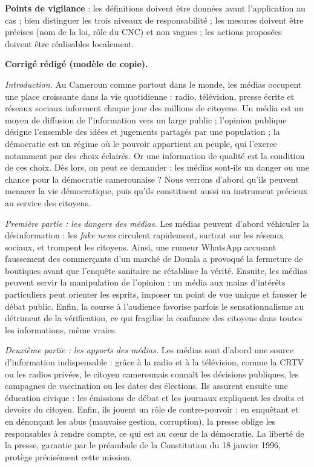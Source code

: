 \documentclass[11pt]{article}
\newcommand{\cle}[1]{{\popxbold\color{popdark}#1}}
\begin{document}
\begin{corrige}
\textbf{Points de vigilance} : les définitions doivent être données avant l'application au cas ; bien distinguer les trois niveaux de responsabilité ; les mesures doivent être précises (nom de la loi, rôle du CNC) et non vagues ; les actions proposées doivent être réalisables localement.
\end{corrige}

\begin{corrige}
\textbf{Corrigé rédigé (modèle de copie).}

\emph{Introduction.} Au Cameroun comme partout dans le monde, les médias occupent une place croissante dans la vie quotidienne : radio, télévision, presse écrite et réseaux sociaux informent chaque jour des millions de citoyens. Un \cle{média} est un moyen de diffusion de l'information vers un large public ; l'\cle{opinion publique} désigne l'ensemble des idées et jugements partagés par une population ; la \cle{démocratie} est un régime où le pouvoir appartient au peuple, qui l'exerce notamment par des choix éclairés. Or une information de qualité est la condition de ces choix. Dès lors, on peut se demander : les médias sont-ils un danger ou une chance pour la démocratie camerounaise ? Nous verrons d'abord qu'ils peuvent menacer la vie démocratique, puis qu'ils constituent aussi un instrument précieux au service des citoyens.

\emph{Première partie : les dangers des médias.} Les médias peuvent d'abord véhiculer la \cle{désinformation} : les \emph{fake news} circulent rapidement, surtout sur les réseaux sociaux, et trompent les citoyens. Ainsi, une rumeur WhatsApp accusant faussement des commerçants d'un marché de Douala a provoqué la fermeture de boutiques avant que l'enquête sanitaire ne rétablisse la vérité. Ensuite, les médias peuvent servir la \cle{manipulation de l'opinion} : un média aux mains d'intérêts particuliers peut orienter les esprits, imposer un point de vue unique et fausser le débat public. Enfin, la course à l'audience favorise parfois le sensationnalisme au détriment de la vérification, ce qui fragilise la confiance des citoyens dans toutes les informations, même vraies.

\emph{Deuxième partie : les apports des médias.} Les médias sont d'abord une source d'\cle{information} indispensable : grâce à la radio et à la télévision, comme la CRTV ou les radios privées, le citoyen camerounais connaît les décisions publiques, les campagnes de vaccination ou les dates des élections. Ils assurent ensuite une \cle{éducation civique} : les émissions de débat et les journaux expliquent les droits et devoirs du citoyen. Enfin, ils jouent un rôle de \cle{contre-pouvoir} : en enquêtant et en dénonçant les abus (mauvaise gestion, corruption), la presse oblige les responsables à rendre compte, ce qui est au cœur de la démocratie. La liberté de la presse, garantie par le préambule de la Constitution du 18 janvier 1996, protège précisément cette mission.


\end{corrige}
\end{document}
